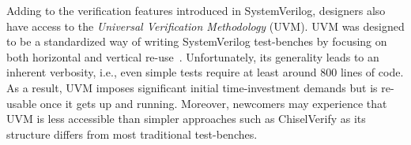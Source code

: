 \documentclass[conference]{IEEEtran}
\begin{document}

Adding to the verification features introduced in SystemVerilog, designers also have 
access to the \textit{Universal Verification Methodology} (UVM). UVM was designed to be a 
standardized way of writing SystemVerilog test-benches by focusing on both horizontal and 
vertical re-use~\cite{uvm2015}. Unfortunately, its generality leads to an inherent 
verbosity, i.e., even simple tests require at least around 800 lines of code. As a result, 
UVM imposes significant initial time-investment demands but is re-usable once it gets up and 
running. Moreover, newcomers may experience that UVM is less accessible than simpler approaches 
such as ChiselVerify as its structure differs from most traditional test-benches.

\end{document}
